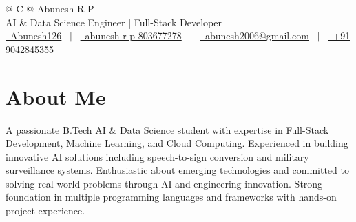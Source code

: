 \documentclass[a4paper,12pt]{article}
\begin{document}
\pagestyle{empty} 



\begin{tabularx}{\linewidth}{@{} C @{}}
\Huge{Abunesh R P} \\[5pt]
\normalsize{AI \& Data Science Engineer | Full-Stack Developer} \\[3pt]
\href{https://github.com/Abunesh126}{\raisebox{-0.05\height}\faGithub\ Abunesh126} \ $|$ \ 
\href{https://linkedin.com/in/abunesh-r-p-803677278}{\raisebox{-0.05\height}\faLinkedin\ abunesh-r-p-803677278} \ $|$ \ 
\href{mailto:abunesh2006@gmail.com}{\raisebox{-0.05\height}\faEnvelope \ abunesh2006@gmail.com} \ $|$ \ 
\href{tel:+919042845355}{\raisebox{-0.05\height}\faMobile \ +91 9042845355} \\
\end{tabularx}


\section{About Me}
A passionate B.Tech AI \& Data Science student with expertise in Full-Stack Development, Machine Learning, and Cloud Computing. Experienced in building innovative AI solutions including speech-to-sign conversion and military surveillance systems. Enthusiastic about emerging technologies and committed to solving real-world problems through AI and engineering innovation. Strong foundation in multiple programming languages and frameworks with hands-on project experience.

\end{document}
